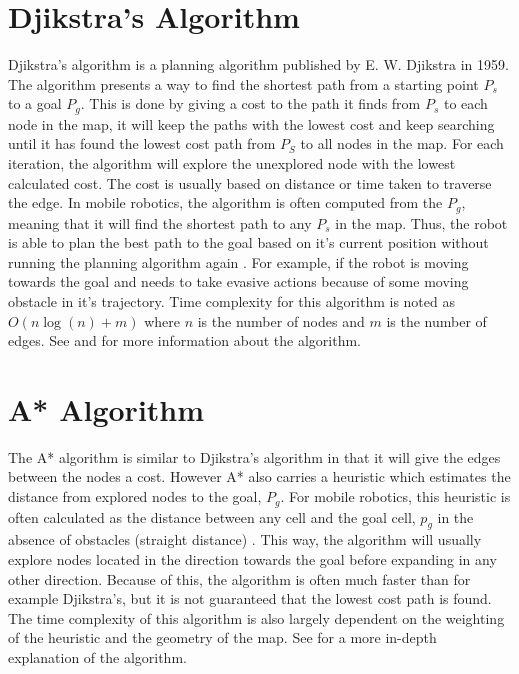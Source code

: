 \section{Djikstra's Algorithm}\label{A:T:AN:PP:DjikstrasAlgotihm}
Djikstra's algorithm is a planning algorithm published by E. W. Djikstra in 1959\cite{DijkstraE.W1959Anot}. The algorithm presents a way to find the shortest path from a starting point $P_s$ to a goal $P_g$. This is done by giving a cost to the path it finds from $P_s$ to each node in the map, it will keep the paths with the lowest cost and keep searching until it has found the lowest cost path from $P_S$ to all nodes in the map. For each iteration, the algorithm will explore the unexplored node with the lowest calculated cost. The cost is usually based on distance or time taken to traverse the edge. In mobile robotics, the algorithm is often computed from the $P_g$, meaning that it will find the shortest path to any $P_s$ in the map. Thus, the robot is able to plan the best path to the goal based on it's current position without running the planning algorithm again \cite{SiegwartRoland2011Itam}. For example, if the robot is moving towards the goal and needs to take evasive actions because of some moving obstacle in it's trajectory. Time complexity for this algorithm is noted as $O(n\log(n)+m)$ where $n$ is the number of nodes and $m$ is the number of edges\cite{SiegwartRoland2011Itam}. See \cite{DijkstraE.W1959Anot} and \cite{SiegwartRoland2011Itam} for more information about the algorithm. 

\section{A* Algorithm}\label{A:T:AN:PP:A*Algorithm}
The A* algorithm is similar to Djikstra's algorithm in that it will give the edges between the nodes a cost. However A* also carries a heuristic which estimates the distance from explored nodes to the goal, $P_g$. For mobile robotics, this heuristic is often calculated as the distance between any cell and the goal cell, $p_g$ in the absence of obstacles (straight distance) \cite{SiegwartRoland2011Itam}. This way, the algorithm will usually explore nodes located in the direction towards the goal before expanding in any other direction. Because of this, the algorithm is often much faster than for example Djikstra's, but it is not guaranteed that the lowest cost path is found. The time complexity of this algorithm is also largely dependent on the weighting of the heuristic and the geometry of the map. See \cite{SiegwartRoland2011Itam} for a more in-depth explanation of the algorithm.


% 



